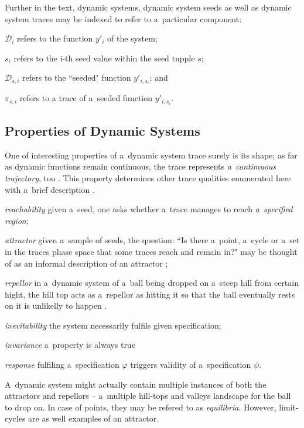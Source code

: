 \documentclass[12pt,oneside,draft]{fithesis}
\newcommand{\mD}{\mathcal{D}}
\begin{document}
Further in the text, dynamic systems, dynamic system seeds as well as
dynamic system traces may be indexed to refer to a~particular component:
\begin{inparaenum}
	\item $\mD_i$ refers to the function $y'_i$ of the system;
	\item $s_i$ refers to the i-th seed value within the seed tupple
		$s$;
	\item $\mD_{s,i}$ refers to the ``seeded" function $y'_{i,s_i}$; and
	\item $\pi_{s,i}$ refers to a trace of a~seeded function
		$y'_{i,s_i}$.
\end{inparaenum}

\subsection{Properties of Dynamic Systems}
One of interesting properties of a~dynamic system trace
surely is its shape; as far as dynamic functions remain continuous,
the trace represents \emph{a~contimuous trajectory}, too \cite{sven}.
This property determines other trace qualities enumerated here
with a~brief description \cite{sven}\cite{rizk}.
\begin{inparaenum}
	\item\emph{reachability} given a~seed, one asks whether a~trace
		manages to reach \emph{a~specified region};
	\item\emph{attractor} given a~sample of seeds, the question:
		``Is there a~point, a~cycle or a~set in the traces phase space
		that some traces reach and remain in?" may be thought of as an
		informal description of an attractor \cite{wiki-atractor};
	\item\emph{repellor} in a~dynamic system of a~ball being dropped on
		a~steep hill from certain hight, the hill top acts as a~repellor
		as hitting it so that the ball eventually rests on it is
		unlikelly to happen \cite{wiki-repellor}.
	\item\emph{inevitability} the system necessarily fulfils given
		specification;
	\item\emph{invariance} a~property is always true
	\item\emph{response} fulfiling a~specification $\varphi$ triggers
		validity of a~specification $\psi$.
\end{inparaenum}

A~dynamic system might actually contain multiple instances of both the
attractors and repellors -- a~multiple hill-tops and valleys landscape
for the ball to drop on. In case of points, they may be refered to as
\emph{equilibria}. However, limit-cycles are as well examples of an
attractor.
\end{document}
